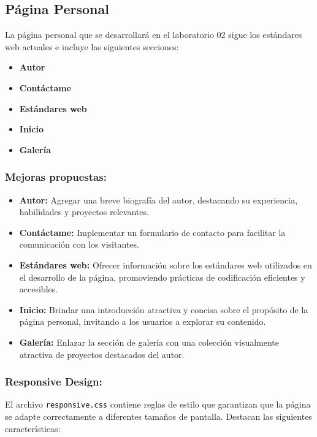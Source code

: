 \subsection{Página Personal}

La página personal que se desarrollará en el laboratorio 02 sigue los estándares web actuales e incluye las siguientes secciones:

\begin{itemize}
    \item \textbf{Autor}
    \item \textbf{Contáctame}
    \item \textbf{Estándares web}
    \item \textbf{Inicio}
    \item \textbf{Galería}
\end{itemize}

\subsubsection{Mejoras propuestas:}

\begin{itemize}
    \item \textbf{Autor:} Agregar una breve biografía del autor, destacando su experiencia, habilidades y proyectos relevantes.
    \item \textbf{Contáctame:} Implementar un formulario de contacto para facilitar la comunicación con los visitantes.
    \item \textbf{Estándares web:} Ofrecer información sobre los estándares web utilizados en el desarrollo de la página, promoviendo prácticas de codificación eficientes y accesibles.
    \item \textbf{Inicio:} Brindar una introducción atractiva y concisa sobre el propósito de la página personal, invitando a los usuarios a explorar su contenido.
    \item \textbf{Galería:} Enlazar la sección de galería con una colección visualmente atractiva de proyectos destacados del autor.
\end{itemize}

\subsubsection{Responsive Design:}

El archivo \texttt{responsive.css} contiene reglas de estilo que garantizan que la página se adapte correctamente a diferentes tamaños de pantalla. Destacan las siguientes características:


